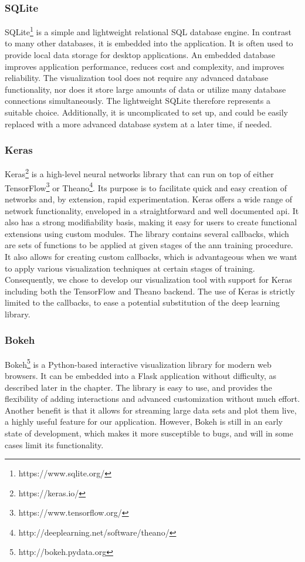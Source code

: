 \subsubsection{SQLite}

SQLite\footnote{https://www.sqlite.org/} is a simple and lightweight relational SQL database engine. In contrast to many other databases, it is embedded into the application. It is often used to provide local data storage for desktop applications. An embedded database improves application performance, reduces cost and complexity, and improves reliability. The visualization tool does not require any advanced database functionality, nor does it store large amounts of data or utilize many database connections simultaneously. The lightweight SQLite therefore represents a suitable choice. Additionally, it is uncomplicated to set up, and could be easily replaced with a more advanced database system at a later time, if needed.

\subsubsection{Keras}

Keras\footnote{https://keras.io/} is a high-level neural networks library that can run on top of either TensorFlow\footnote{https://www.tensorflow.org/} or Theano\footnote{http://deeplearning.net/software/theano/}. Its purpose is to facilitate quick and easy creation of networks and, by extension, rapid experimentation. Keras offers a wide range of network functionality, enveloped in a straightforward and well documented \acrshort{api}. It also has a strong modifiability basis, making it easy for users to create functional extensions using custom modules. The library contains several callbacks, which are sets of functions to be applied at given stages of the \acrshort{ann} training procedure. It also allows for creating custom callbacks, which is advantageous when we want to apply various visualization techniques at certain stages of training. Consequently, we chose to develop our visualization tool with support for Keras including both the TensorFlow and Theano backend. The use of Keras is strictly limited to the callbacks, to ease a potential substitution of the deep learning library.

\subsubsection{Bokeh}

Bokeh\footnote{http://bokeh.pydata.org} is a Python-based interactive visualization library for modern web browsers. It can be embedded into a Flask application without difficulty, as described later in the chapter. The library is easy to use, and provides the flexibility of adding interactions and advanced customization without much effort. Another benefit is that it allows for streaming large data sets and plot them live, a highly useful feature for our application. However, Bokeh is still in an early state of development, which makes it more susceptible to bugs, and will in some cases limit its functionality.

